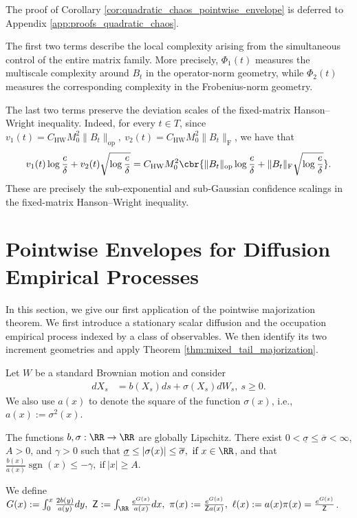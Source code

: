 \documentclass[11pt]{article}
\begin{document}
The proof of Corollary
\ref{cor:quadratic_chaos_pointwise_envelope} is deferred to
Appendix \ref{app:proofs_quadratic_chaos}.

The first two terms describe the local complexity arising from the
simultaneous control of the entire matrix family. More precisely,
$\Phi_1(t)$ measures the multiscale complexity around $B_t$ in the
operator-norm geometry, while $\Phi_2(t)$ measures the corresponding
complexity in the Frobenius-norm geometry.

The last two terms preserve the deviation scales of the fixed-matrix
Hanson--Wright inequality. Indeed, for every $t\in T$, since $v_1(t)=
C_{\mathrm{HW}}M_0^2\|B_t\|_{\mathrm{op}},\ 
v_2(t)=
C_{\mathrm{HW}}M_0^2\|B_t\|_{\mathrm F}$, we have that
\begin{align*}
v_1(t)\log\frac{e}{\delta}+v_2(t)\sqrt{\log\frac{e}{\delta}}=
C_{\mathrm{HW}}M_0^2
\cbr{
\|B_t\|_{\mathrm{op}}\log\frac{e}{\delta}
+
\|B_t\|_{\mathrm F}
\sqrt{\log\frac{e}{\delta}}
}.
\end{align*}
These are precisely the sub-exponential and sub-Gaussian confidence
scalings in the fixed-matrix Hanson--Wright inequality.
\fi

\section{Pointwise Envelopes for Diffusion Empirical Processes}
\label{sec:pointwise_ergodic_diffusion}

In this section, we give our first application of the pointwise
majorization theorem. We first introduce a stationary scalar diffusion and
the occupation empirical process indexed by a class of observables. We then
identify its two increment geometries and apply Theorem
\ref{thm:mixed_tail_majorization}.

Let $W$ be a standard Brownian motion and consider
\begin{align}
dX_s
&=
b(X_s)ds+\sigma(X_s)dW_s,
\ s\ge0.
\label{eq:diffusion_sde}
\end{align}
We also use $a(x)$ to denote the square of the function $\sigma(x)$, i.e., $a(x):=\sigma^2(x)$.
\begin{assumption}
\label{ass:diffusion_coefficients}
The functions $b,\sigma:\RR\to\RR$ are globally Lipschitz. There exist
$0<\underline\sigma\le\overline\sigma<\infty$, $A>0$, and $\gamma>0$
such that $\underline\sigma
\le |\sigma(x)|
\le \overline\sigma,
\ \text{if}\ x\in\RR$, and that $\frac{b(x)}{a(x)}\operatorname{sgn}(x)
\le-\gamma,
\ \text{if}\ |x|\ge A$.
\end{assumption}
We define
$G(x):=
\int_0^x\frac{2b(y)}{a(y)}dy,\ 
\mathsf Z:=
\int_{\RR}\frac{e^{G(x)}}{a(x)}dx,\ 
\pi(x)
:=
\frac{e^{G(x)}}{\mathsf Z a(x)},\ 
\ell(x):=
a(x)\pi(x)
=
\frac{e^{G(x)}}{\mathsf Z}$.
\end{document}

